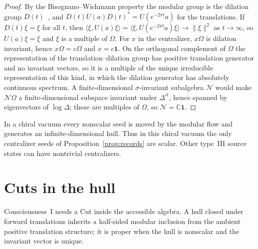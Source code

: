 \documentclass[12pt]{article}
\theoremstyle{definition}
\theoremstyle{remark}
\begin{document}
\begin{proof}
By the Bisognano--Wichmann property the modular group is the dilation group
\(D(t)\)~\cite{BGL}, and \(D(t)U(a)D(t)^*=U(e^{-2\pi t}a)\) for the translations. If
\(D(t)\xi=\xi\) for all \(t\), then
\(\langle\xi,U(a)\xi\rangle=\langle\xi,U(e^{-2\pi t}a)\xi\rangle\to\|\xi\|^2\) as
\(t\to\infty\), so \(U(a)\xi=\xi\) and \(\xi\) is a multiple of \(\Omega\). For \(x\) in
the centralizer, \(x\Omega\) is dilation invariant, hence \(x\Omega=c\Omega\) and
\(x=c\mathbf 1\). On the orthogonal complement of \(\Omega\) the representation of the
translation--dilation group has positive translation generator and no invariant
vectors, so it is a multiple of the unique irreducible representation of this kind, in
which the dilation generator has absolutely continuous spectrum. A finite-dimensional
\(\sigma\)-invariant subalgebra \(\mathcal N\) would make \(\mathcal N\Omega\) a
finite-dimensional subspace invariant under \(\Delta^{it}\), hence spanned by
eigenvectors of \(\log\Delta\); these are multiples of \(\Omega\), so
\(\mathcal N=\mathbb C\mathbf 1\).
\end{proof}

In a chiral vacuum every nonscalar seed is moved by the modular flow and generates an
infinite-dimensional hull. Thus in this chiral vacuum the only
centralizer seeds of Proposition~\ref{prop:records} are scalar.
Other type~III source states can have nontrivial centralizers.

\section{Cuts in the hull}\label{sec:cut}

Consciousness~I needs a Cut inside the accessible algebra. A hull closed under
forward translations inherits a half-sided modular inclusion from the ambient positive translation structure;
it is proper when the hull is nonscalar and the invariant vector is unique.
\end{document}
